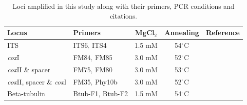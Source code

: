 \documentclass[12pt]{article}
\begin{document}
\begin{table}[!ht]
\caption{
Loci amplified in this study along with their primers, PCR conditions and citations.}
\begin{tabular}{llccc}
\hline
\textbf{Locus}	& \textbf{Primers}	&  \textbf{MgCl$_{2}$}   & \textbf{Annealing} &	\textbf{Reference} \\
\hline
ITS		&	ITS6, ITS4	& 1.5 mM & 54$^{\circ}$C &	\cite{grunwald_etal_2011} \\
\emph{cox}I		&	FM84, FM85	& 3.0 mM & 52$^{\circ}$C &	\cite{martin2003phylogenetic} \\
\emph{cox}II \& spacer	&	FM75, FM80	& 3.0 mM & 53$^{\circ}$C &	\cite{martin2003phylogenetic} \\
\emph{cox}II, spacer \& \emph{cox}I &	FM35, Phy10b	& 3.0 mM & 52$^{\circ}$C &	\cite{martin2000phylogenetic, martin2003phylogenetic} \\
Beta-tubulin	&	Btub-F1, Btub-F2 & 1.5 mM & 54$^{\circ}$C &	\cite{kroon2004phylogenetic, blair2008multi} \\
\hline
\end{tabular}
\label{tab:loci}
\end{table}
\end{document}
